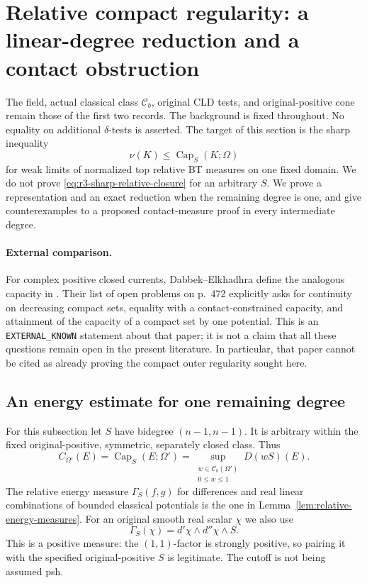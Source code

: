 \documentclass[11pt,a4paper]{article}
\numberwithin{equation}{section}
\theoremstyle{definition}
\theoremstyle{remark}
\newcommand{\Cb}{\mathcal C_b}
\begin{document}


\section{Relative compact regularity: a linear-degree reduction and a contact obstruction}
\label{sec:r3-relative-compact-capacity}

The field, actual classical class $\Cb$, original CLD tests, and
original-positive cone remain those of the first two records. The
background is fixed throughout. No equality on additional
$\delta$-tests is asserted. The target of this section is the sharp
inequality
\[
 \nu(K)\leq\operatorname{Cap}_S(K;\Omega)
 \tag{RC}\label{eq:r3-sharp-relative-closure}
\]
for weak limits of normalized top relative BT measures on one fixed
domain. We do not prove \eqref{eq:r3-sharp-relative-closure} for an
arbitrary $S$. We prove a representation and an exact reduction when
the remaining degree is one, and give counterexamples to a proposed
contact-measure proof in every intermediate degree.

\paragraph{External comparison.}
For complex positive closed currents, Dabbek--Elkhadhra define the
analogous capacity in \cite[Definition~2.1, p.~471]{DE06}. Their list
of open problems on p.~472 explicitly asks for continuity on
decreasing compact sets, equality with a contact-constrained
capacity, and attainment of the capacity of a compact set by one
potential. This is an \texttt{EXTERNAL\_KNOWN} statement about that
paper; it is not a claim that all these questions remain open in the
present literature. In particular, that paper cannot be cited as
already proving the compact outer regularity sought here.

\subsection{An energy estimate for one remaining degree}

For this subsection let $S$ have bidegree $(n-1,n-1)$. It is
arbitrary within the fixed original-positive, symmetric, separately
closed class. Thus
\[
 C_{\Omega'}(E)=\operatorname{Cap}_S(E;\Omega')
   =\sup_{\substack{w\in\Cb(\Omega')\\0\leq w\leq1}}
        D(wS)(E).
\]
The relative energy measure $\Gamma_S(f,g)$ for differences and
real linear combinations of bounded classical potentials is the one
in Lemma~\ref{lem:relative-energy-measures}.
For an original smooth real scalar $\chi$ we also use
\[
 \Gamma_S(\chi)=d'\chi\wedge d''\chi\wedge S.
\]
This is a positive measure: the $(1,1)$-factor is strongly positive,
so pairing it with the specified original-positive $S$ is legitimate.
The cutoff is not being assumed psh.
\end{document}
